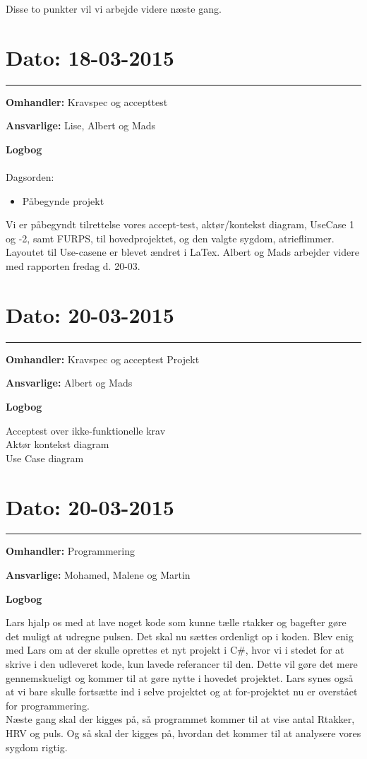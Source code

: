 Disse to punkter vil vi arbejde videre næste gang.


\section{Dato: 18-03-2015}
\hrule

\textbf{Omhandler:}  Kravspec og accepttest 

\textbf{Ansvarlige:} Lise, Albert og Mads
 
\textbf{Logbog}
\\
\\
Dagsorden:
\begin{itemize}
	\item Påbegynde projekt
\end{itemize}

Vi er påbegyndt tilrettelse vores accept-test, aktør/kontekst diagram, UseCase 1 og -2, samt FURPS, til hovedprojektet, og den valgte sygdom, atrieflimmer. Layoutet til Use-casene er blevet ændret i LaTex. Albert og Mads arbejder videre med rapporten fredag d. 20-03.


\section{Dato: 20-03-2015}
\hrule 

\textbf{Omhandler: } Kravspec og acceptest Projekt

\textbf{Ansvarlige:} Albert og Mads

\textbf{Logbog}

Acceptest over ikke-funktionelle krav \\
Aktør kontekst diagram
\\ Use Case diagram


\section{Dato: 20-03-2015}
\hrule

\textbf{Omhandler:} Programmering

\textbf{Ansvarlige:} Mohamed, Malene og Martin

\textbf{Logbog}

Lars hjalp os med at lave noget kode som kunne tælle rtakker og bagefter gøre det muligt at udregne pulsen. Det skal nu sættes ordenligt op i koden. Blev enig med Lars om at der skulle oprettes et nyt projekt i C\#, hvor vi i stedet for at skrive i den udleveret kode, kun lavede referancer til den. Dette vil gøre det mere gennemskueligt og kommer til at gøre nytte i hovedet projektet. Lars synes også at vi bare skulle fortsætte ind i selve projektet og at for-projektet nu er overstået for programmering.\\	
	Næste gang skal der kigges på, så programmet kommer til at vise antal Rtakker, HRV og puls. Og så skal der kigges på, hvordan det kommer til at analysere vores sygdom rigtig.


